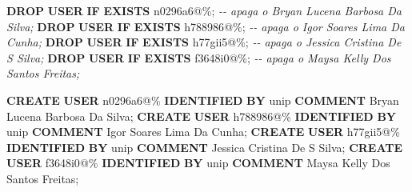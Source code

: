 \documentclass[
]{book}
\newenvironment{Shaded}{\begin{snugshade}}{\end{snugshade}}
\newcommand{\CommentTok}[1]{\textcolor[rgb]{0.56,0.35,0.01}{\textit{#1}}}
\newcommand{\ControlFlowTok}[1]{\textcolor[rgb]{0.13,0.29,0.53}{\textbf{#1}}}
\newcommand{\FunctionTok}[1]{\textcolor[rgb]{0.13,0.29,0.53}{\textbf{#1}}}
\newcommand{\KeywordTok}[1]{\textcolor[rgb]{0.13,0.29,0.53}{\textbf{#1}}}
\newcommand{\NormalTok}[1]{#1}
\newcommand{\StringTok}[1]{\textcolor[rgb]{0.31,0.60,0.02}{#1}}
\begin{document}
\begin{Shaded}
\begin{Highlighting}[]
\KeywordTok{DROP} \FunctionTok{USER} \ControlFlowTok{IF} \KeywordTok{EXISTS} \StringTok{\textquotesingle{}n0296a6\textquotesingle{}}\NormalTok{@}\StringTok{\textquotesingle{}\%\textquotesingle{}}\NormalTok{; }\CommentTok{{-}{-} apaga o \textquotesingle{}Bryan Lucena Barbosa Da Silva\textquotesingle{};}
\KeywordTok{DROP} \FunctionTok{USER} \ControlFlowTok{IF} \KeywordTok{EXISTS} \StringTok{\textquotesingle{}h788986\textquotesingle{}}\NormalTok{@}\StringTok{\textquotesingle{}\%\textquotesingle{}}\NormalTok{; }\CommentTok{{-}{-} apaga o \textquotesingle{}Igor Soares Lima Da Cunha\textquotesingle{};}
\KeywordTok{DROP} \FunctionTok{USER} \ControlFlowTok{IF} \KeywordTok{EXISTS} \StringTok{\textquotesingle{}h77gii5\textquotesingle{}}\NormalTok{@}\StringTok{\textquotesingle{}\%\textquotesingle{}}\NormalTok{; }\CommentTok{{-}{-} apaga o \textquotesingle{}Jessica Cristina De S Silva\textquotesingle{};}
\KeywordTok{DROP} \FunctionTok{USER} \ControlFlowTok{IF} \KeywordTok{EXISTS} \StringTok{\textquotesingle{}f3648i0\textquotesingle{}}\NormalTok{@}\StringTok{\textquotesingle{}\%\textquotesingle{}}\NormalTok{; }\CommentTok{{-}{-} apaga o \textquotesingle{}Maysa Kelly Dos Santos Freitas\textquotesingle{};}


\KeywordTok{CREATE} \FunctionTok{USER} \StringTok{\textquotesingle{}n0296a6\textquotesingle{}}\NormalTok{@}\StringTok{\textquotesingle{}\%\textquotesingle{}} \KeywordTok{IDENTIFIED} \KeywordTok{BY} \StringTok{\textquotesingle{}unip\textquotesingle{}} \KeywordTok{COMMENT}  \StringTok{\textquotesingle{}Bryan Lucena Barbosa Da Silva\textquotesingle{}}\NormalTok{;}
\KeywordTok{CREATE} \FunctionTok{USER} \StringTok{\textquotesingle{}h788986\textquotesingle{}}\NormalTok{@}\StringTok{\textquotesingle{}\%\textquotesingle{}} \KeywordTok{IDENTIFIED} \KeywordTok{BY} \StringTok{\textquotesingle{}unip\textquotesingle{}} \KeywordTok{COMMENT}  \StringTok{\textquotesingle{}Igor Soares Lima Da Cunha\textquotesingle{}}\NormalTok{;}
\KeywordTok{CREATE} \FunctionTok{USER} \StringTok{\textquotesingle{}h77gii5\textquotesingle{}}\NormalTok{@}\StringTok{\textquotesingle{}\%\textquotesingle{}} \KeywordTok{IDENTIFIED} \KeywordTok{BY} \StringTok{\textquotesingle{}unip\textquotesingle{}} \KeywordTok{COMMENT}  \StringTok{\textquotesingle{}Jessica Cristina De S Silva\textquotesingle{}}\NormalTok{;}
\KeywordTok{CREATE} \FunctionTok{USER} \StringTok{\textquotesingle{}f3648i0\textquotesingle{}}\NormalTok{@}\StringTok{\textquotesingle{}\%\textquotesingle{}} \KeywordTok{IDENTIFIED} \KeywordTok{BY} \StringTok{\textquotesingle{}unip\textquotesingle{}} \KeywordTok{COMMENT}  \StringTok{\textquotesingle{}Maysa Kelly Dos Santos Freitas\textquotesingle{}}\NormalTok{;}
\end{Highlighting}
\end{Shaded}
\end{document}
